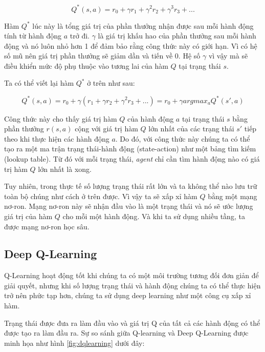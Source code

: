 \begin{equation*}
    Q^*(s,a) = r_0 + {\gamma}r_1 + {\gamma}^{2}r_2 + {\gamma}^{3}r_3 + ...
\end{equation*}

Hàm $Q^*$ lúc này là tổng giá trị của phần thưởng nhận được sau mỗi hành động tính từ hành động $a$ trở đi. $\gamma$ là giá trị khấu hao của phần thưởng sau mỗi hành động và nó luôn nhỏ hơn 1 để đảm bảo rằng công thức này có giới hạn. Vì có hệ số mũ nên giá trị phần thưởng sẽ giảm dần và tiến về 0. Hệ số $\gamma$ vì vậy mà sẽ điều khiển mức độ phụ thuộc vào tương lai của hàm $Q$ tại trạng thái $s$.\newline

Ta có thể viết lại hàm $Q^*$ ở trên như sau:

\begin{equation*}
    Q^*(s,a) = r_0 + {\gamma}(r_1 + {\gamma}r_2 + {\gamma}^{2}r_3 + ...) = r_0 + {\gamma}argmax_{a}Q^{*}(s',a)
\end{equation*}

Công thức này cho thấy giá trị hàm $Q$ của hành động $a$ tại trạng thái $s$ bằng phần thưởng $r(s,a)$ cộng với giá trị hàm $Q$ lớn nhất của các trạng thái $s'$ tiếp theo khi thực hiện các hành động $a$. Do đó, với công thức này chúng ta có thể tạo ra một ma trận trạng thái-hành động (state-action) như một bảng tìm kiếm (lookup table). Từ đó với mỗi trạng thái, \textit{agent} chỉ cần tìm hành động nào có giá trị hàm $Q$ lớn nhất là xong.\newline

Tuy nhiên, trong thực tế số lượng trạng thái rất lớn và ta không thể nào lưu trữ toàn bộ chúng như cách ở trên được. Vì vậy ta sẽ xấp xỉ hàm $Q$ bằng một mạng nơ-ron. Mạng nơ-ron này sẽ nhận đầu vào là một trạng thái và nó sẽ ước lượng giá trị của hàm $Q$ cho mỗi một hành động. Và khi ta sử dụng nhiều tầng, ta được mạng nơ-ron học sâu.

\subsection{Deep Q-Learning}
Q-Learning hoạt động tốt khi chúng ta có một môi trường tương đối đơn giản để giải quyết, nhưng khi số lượng trạng thái và hành động chúng ta có thể thực hiện trở nên phức tạp hơn, chúng ta sử dụng deep learning như một công cụ xấp xỉ hàm.

Trạng thái được đưa ra làm đầu vào và giá trị Q của tất cả các hành động có thể được tạo ra làm đầu ra. Sự so sánh giữa Q-learning và Deep Q-Learning được minh họa như hình \ref{fig:dqlearning} \cite{introductiondeepqlearningpython} dưới đây:

